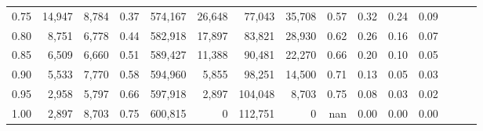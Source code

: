 \begin{tabular}{rrrrrrrrrrrrrrr}
0.75 &  14,947 &  8,784 &  0.37 &  574,167 &   26,648 &   77,043 &   35,708 &  0.57 &  0.32 &  0.24 &      0.09 \\
0.80 &   8,751 &  6,778 &  0.44 &  582,918 &   17,897 &   83,821 &   28,930 &  0.62 &  0.26 &  0.16 &      0.07 \\
0.85 &   6,509 &  6,660 &  0.51 &  589,427 &   11,388 &   90,481 &   22,270 &  0.66 &  0.20 &  0.10 &      0.05 \\
0.90 &   5,533 &  7,770 &  0.58 &  594,960 &    5,855 &   98,251 &   14,500 &  0.71 &  0.13 &  0.05 &      0.03 \\
0.95 &   2,958 &  5,797 &  0.66 &  597,918 &    2,897 &  104,048 &    8,703 &  0.75 &  0.08 &  0.03 &      0.02 \\
1.00 &   2,897 &  8,703 &  0.75 &  600,815 &        0 &  112,751 &        0 &   nan &  0.00 &  0.00 &      0.00 \\
\bottomrule
\end{tabular}
